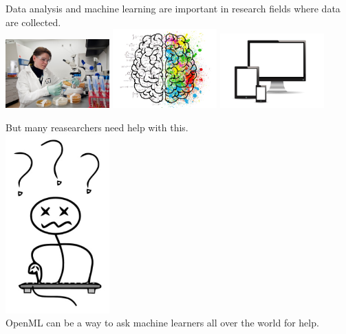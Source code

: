 \documentclass{beamer}
\begin{document}
\begin{frame}[fragile]{}
\large 
\begin{center}
Data analysis and machine learning are important in research 
fields where data are collected.\\[2em]

\includegraphics[width = 0.3\textwidth]{lab}
\includegraphics[width = 0.3\textwidth]{psy}
\includegraphics[width = 0.3\textwidth]{wifi}
\end{center}
\end{frame}

\begin{frame}[fragile]{}
\large 
\begin{center}
But many reasearchers need help with this.\\
\includegraphics[width = 0.3\textwidth]{confused}\\
OpenML can be a way to ask machine learners all over the world for help.
\end{center}
\end{frame}
\end{document}
